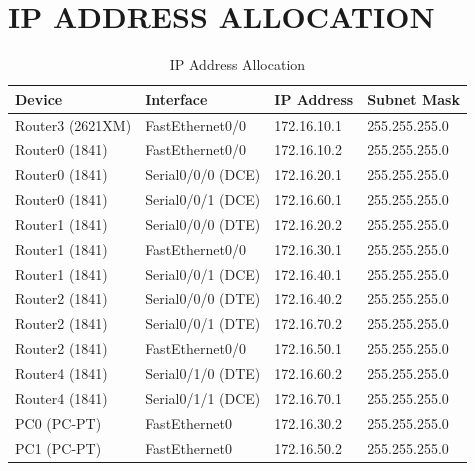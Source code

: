 \documentclass[12pt,a4paper]{article}
\begin{document}
\section*{IP ADDRESS ALLOCATION}
\begin{table}[H]
	\centering
	\begin{tabular}{|l|l|l|l|}
		\hline
		\textbf{Device} & \textbf{Interface} & \textbf{IP Address} & \textbf{Subnet Mask} \\ \hline
		Router3 (2621XM) & FastEthernet0/0   & 172.16.10.1 & 255.255.255.0 \\ \hline
		Router0 (1841)   & FastEthernet0/0   & 172.16.10.2 & 255.255.255.0 \\ \hline
		Router0 (1841)   & Serial0/0/0 (DCE) & 172.16.20.1 & 255.255.255.0 \\ \hline
		Router0 (1841)   & Serial0/0/1 (DCE) & 172.16.60.1 & 255.255.255.0 \\ \hline
		Router1 (1841)   & Serial0/0/0 (DTE) & 172.16.20.2 & 255.255.255.0 \\ \hline
		Router1 (1841)   & FastEthernet0/0   & 172.16.30.1 & 255.255.255.0 \\ \hline
		Router1 (1841)   & Serial0/0/1 (DCE) & 172.16.40.1 & 255.255.255.0 \\ \hline
		Router2 (1841)   & Serial0/0/0 (DTE) & 172.16.40.2 & 255.255.255.0 \\ \hline
		Router2 (1841)   & Serial0/0/1 (DTE) & 172.16.70.2 & 255.255.255.0 \\ \hline
		Router2 (1841)   & FastEthernet0/0   & 172.16.50.1 & 255.255.255.0 \\ \hline
		Router4 (1841)   & Serial0/1/0 (DTE) & 172.16.60.2 & 255.255.255.0 \\ \hline
		Router4 (1841)   & Serial0/1/1 (DCE) & 172.16.70.1 & 255.255.255.0 \\ \hline
		PC0 (PC-PT)      & FastEthernet0     & 172.16.30.2 & 255.255.255.0 \\ \hline
		PC1 (PC-PT)      & FastEthernet0     & 172.16.50.2 & 255.255.255.0 \\ \hline
	\end{tabular}
	\caption{IP Address Allocation}
\end{table}
\end{document}
